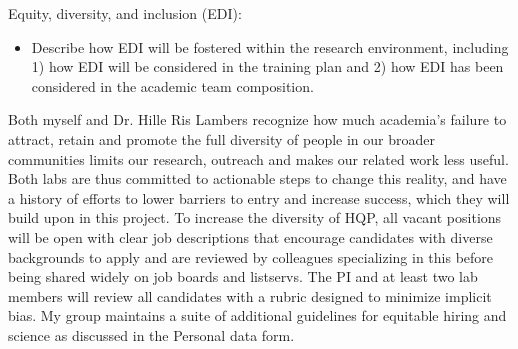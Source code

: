 \documentclass[12pt,oneside]{article}
\newenvironment{smitemize}{
\begin{itemize}
  \setlength{\itemsep}{1pt}
  \setlength{\parskip}{0pt}
  \setlength{\parsep}{0pt}}
{\end{itemize}
}
\begin{document}
{\sc Equity, diversity, and inclusion (EDI):}  %
\vspace{-1ex}
\begin{smitemize}
\item  Describe how EDI will be fostered within the research environment, including 1) how EDI will be considered in the training plan and 2) how EDI has been considered in the academic team composition.
\end{smitemize}
Both myself and Dr. Hille Ris Lambers recognize how much academia's failure to attract, retain and promote the full diversity of people in our broader communities limits our research, outreach and makes our related work less useful. Both labs are thus committed to actionable steps to change this reality, and have a history of efforts to lower barriers to entry and increase success, which they will build upon in this project. To increase the diversity of HQP, all vacant positions will be open with clear job descriptions that encourage candidates with diverse backgrounds to apply and are reviewed by colleagues specializing in this before being shared widely on job boards and listservs.  The PI and at least two lab members will review all candidates with a rubric designed to minimize implicit bias. My group maintains a suite of additional guidelines for equitable hiring and science as discussed in the Personal data form. %
\end{document}
